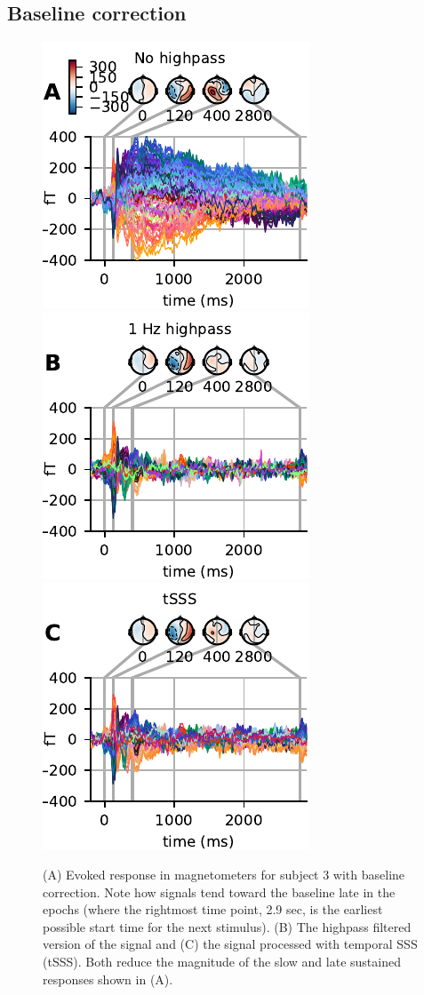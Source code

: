    
\subsection{Baseline correction}
\label{sec:baseline}

\begin{figure}[t]
  \centering
  \includegraphics[width=0.31\linewidth]{figures/FanningA.pdf}
  \hspace{0.5em}
  \includegraphics[width=0.31\linewidth]{figures/FanningB.pdf}
  \hspace{0.5em}
  \includegraphics[width=0.31\linewidth]{figures/FanningC.pdf}
\caption[Comparison of highpass filtering and tSSS on evoked response.]{(A) Evoked response in magnetometers for subject 3 with baseline correction. Note how signals tend toward the baseline late in the epochs (where the rightmost time point, 2.9 sec, is the earliest possible start time for the next stimulus). (B) The highpass filtered version of the signal and (C) the signal processed with temporal SSS (tSSS). Both reduce the magnitude of the slow and late sustained responses shown in (A).}
\label{fig:fanning}
\end{figure}
  
